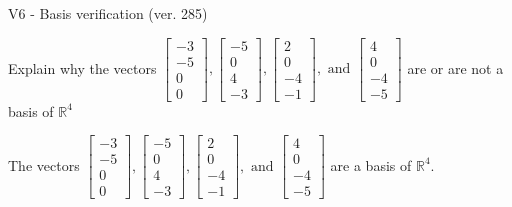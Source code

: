 \begin{exercise}
  \begin{exerciseTitle}V6 - Basis verification (ver. 285)\end{exerciseTitle}
  \begin{exerciseStatement}
    Explain why the vectors \(\left[\begin{array}{r}
-3 \\
-5 \\
0 \\
0
\end{array}\right] , \left[\begin{array}{r}
-5 \\
0 \\
4 \\
-3
\end{array}\right] , \left[\begin{array}{r}
2 \\
0 \\
-4 \\
-1
\end{array}\right] , \text{ and } \left[\begin{array}{r}
4 \\
0 \\
-4 \\
-5
\end{array}\right]\) are or are not a basis of \(\mathbb{R}^4\)	


  \end{exerciseStatement}
  \begin{exerciseAnswer}
   The vectors \(\left[\begin{array}{r}
-3 \\
-5 \\
0 \\
0
\end{array}\right] , \left[\begin{array}{r}
-5 \\
0 \\
4 \\
-3
\end{array}\right] , \left[\begin{array}{r}
2 \\
0 \\
-4 \\
-1
\end{array}\right] , \text{ and } \left[\begin{array}{r}
4 \\
0 \\
-4 \\
-5
\end{array}\right]\) 
  	 are  a basis of \(\mathbb{R}^4\).
  


  \end{exerciseAnswer}
\end{exercise}